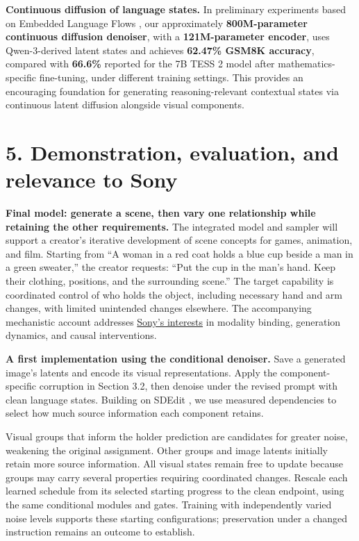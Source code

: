 \documentclass[11pt,letterpaper]{article}
\begin{document}
\textbf{Continuous diffusion of language states.} In preliminary experiments based on Embedded Language Flows \citep{elf}, our approximately \textbf{800M-parameter continuous diffusion denoiser}, with a \textbf{121M-parameter encoder}, uses Qwen-3-derived latent states and achieves \textbf{62.47\% GSM8K accuracy}, compared with \textbf{66.6\%} reported for the 7B TESS 2 \citep{tess} model after mathematics-specific fine-tuning, under different training settings. This provides an encouraging foundation for generating reasoning-relevant contextual states via continuous latent diffusion alongside visual components.

\hypertarget{demonstration-evaluation-and-relevance-to-sony}{%
\section{5. Demonstration, evaluation, and relevance to Sony}\label{demonstration-evaluation-and-relevance-to-sony}}

\textbf{Final model: generate a scene, then vary one relationship while retaining the other requirements.} The integrated model and sampler will support a creator's iterative development of scene concepts for games, animation, and film. Starting from ``A woman in a red coat holds a blue cup beside a man in a green sweater,'' the creator requests: ``Put the cup in the man's hand. Keep their clothing, positions, and the surrounding scene.'' The target capability is coordinated control of who holds the object, including necessary hand and arm changes, with limited unintended changes elsewhere. The accompanying mechanistic account addresses \href{https://www.sony.com/en/SonyInfo/research-award-program/}{Sony's interests} in modality binding, generation dynamics, and causal interventions.

\textbf{A first implementation using the conditional denoiser.} Save a generated image's latents and encode its visual representations. Apply the component-specific corruption in Section 3.2, then denoise under the revised prompt with clean language states. Building on SDEdit \citep{sdedit}, we use measured dependencies to select how much source information each component retains.

Visual groups that inform the holder prediction are candidates for greater noise, weakening the original assignment. Other groups and image latents initially retain more source information. All visual states remain free to update because groups may carry several properties requiring coordinated changes. Rescale each learned schedule from its selected starting progress to the clean endpoint, using the same conditional modules and gates. Training with independently varied noise levels supports these starting configurations; preservation under a changed instruction remains an outcome to establish.
\end{document}
